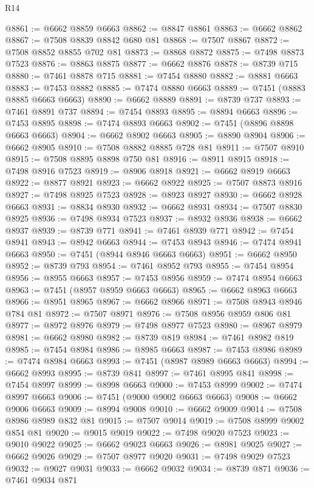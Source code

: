 \begin{lexlean}{R14}
\begin{coremodule}
@8861 := @6662 @8859 @6663
@8862 := @8847 @8861
@8863 := @6662 @8862
@8867 := @7508 @8839 @8842 @680 @81
@8868 := @7507 @8867
@8872 := @7508 @8852 @8855 @702 @81
@8873 := @8868 @8872
@8875 := @7498 @8873 @7523
@8876 := @8863 @8875
@8877 := @6662 @8876
@8878 := @8739 @715
@8880 := @7461 @8878 @715
@8881 := @7454 @8880
@8882 := @8881 @6663
@8883 := @7453 @8882
@8885 := @7474 @8880 @6663
@8889 := @7451 (@8883 @8885 @6663 @6663)
@8890 := @6662 @8889
@8891 := @8739 @737
@8893 := @7461 @8891 @737
@8894 := @7454 @8893
@8895 := @8894 @6663
@8896 := @7453 @8895
@8898 := @7474 @8893 @6663
@8902 := @7451 (@8896 @8898 @6663 @6663)
@8904 := @6662 @8902 @6663
@8905 := @8890 @8904
@8906 := @6662 @8905
@8910 := @7508 @8882 @8885 @728 @81
@8911 := @7507 @8910
@8915 := @7508 @8895 @8898 @750 @81
@8916 := @8911 @8915
@8918 := @7498 @8916 @7523
@8919 := @8906 @8918
@8921 := @6662 @8919 @6663
@8922 := @8877 @8921
@8923 := @6662 @8922
@8925 := @7507 @8873 @8916
@8927 := @7498 @8925 @7523
@8928 := @8923 @8927
@8930 := @6662 @8928 @6663
@8931 := @8834 @8930
@8932 := @6662 @8931
@8934 := @7507 @8830 @8925
@8936 := @7498 @8934 @7523
@8937 := @8932 @8936
@8938 := @6662 @8937
@8939 := @8739 @771
@8941 := @7461 @8939 @771
@8942 := @7454 @8941
@8943 := @8942 @6663
@8944 := @7453 @8943
@8946 := @7474 @8941 @6663
@8950 := @7451 (@8944 @8946 @6663 @6663)
@8951 := @6662 @8950
@8952 := @8739 @793
@8954 := @7461 @8952 @793
@8955 := @7454 @8954
@8956 := @8955 @6663
@8957 := @7453 @8956
@8959 := @7474 @8954 @6663
@8963 := @7451 (@8957 @8959 @6663 @6663)
@8965 := @6662 @8963 @6663
@8966 := @8951 @8965
@8967 := @6662 @8966
@8971 := @7508 @8943 @8946 @784 @81
@8972 := @7507 @8971
@8976 := @7508 @8956 @8959 @806 @81
@8977 := @8972 @8976
@8979 := @7498 @8977 @7523
@8980 := @8967 @8979
@8981 := @6662 @8980
@8982 := @8739 @819
@8984 := @7461 @8982 @819
@8985 := @7454 @8984
@8986 := @8985 @6663
@8987 := @7453 @8986
@8989 := @7474 @8984 @6663
@8993 := @7451 (@8987 @8989 @6663 @6663)
@8994 := @6662 @8993
@8995 := @8739 @841
@8997 := @7461 @8995 @841
@8998 := @7454 @8997
@8999 := @8998 @6663
@9000 := @7453 @8999
@9002 := @7474 @8997 @6663
@9006 := @7451 (@9000 @9002 @6663 @6663)
@9008 := @6662 @9006 @6663
@9009 := @8994 @9008
@9010 := @6662 @9009
@9014 := @7508 @8986 @8989 @832 @81
@9015 := @7507 @9014
@9019 := @7508 @8999 @9002 @854 @81
@9020 := @9015 @9019
@9022 := @7498 @9020 @7523
@9023 := @9010 @9022
@9025 := @6662 @9023 @6663
@9026 := @8981 @9025
@9027 := @6662 @9026
@9029 := @7507 @8977 @9020
@9031 := @7498 @9029 @7523
@9032 := @9027 @9031
@9033 := @6662 @9032
@9034 := @8739 @871
@9036 := @7461 @9034 @871

\end{coremodule}
\end{lexlean}
